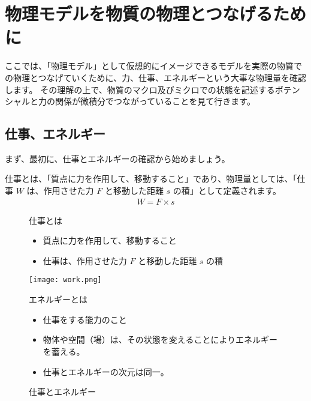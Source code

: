 \documentclass[uplatex,dvipdfmx,a4paper,11pt]{jsarticle}
\begin{document}
\section{物理モデルを物質の物理とつなげるために}

ここでは、「物理モデル」として仮想的にイメージできるモデルを実際の物質での物理とつなげていくために、力、仕事、エネルギーという大事な物理量を確認します。
その理解の上で、物質のマクロ及びミクロでの状態を記述するポテンシャルと力の関係が微積分でつながっていることを見て行きます。

\subsection{仕事、エネルギー}

まず、最初に、仕事とエネルギーの確認から始めましょう。

仕事とは、「質点に力を作用して、移動すること」であり、物理量としては、「仕事 $W$ は、作用させた力 $F$ と移動した距離 $s$ の積」として定義されます。
\begin{align*}
	W=F \times s
\end{align*}
\begin{figure}[htb]
	\begin{center}
		\begin{minipage}{0.42\textwidth}
			\large
			\begin{itembox}[l]{仕事とは}
				\begin{itemize}
					\item 質点に力を作用して、移動すること
					\item 仕事は、作用させた力 $F$ と移動した距離 $s$ の積
				\end{itemize}
					\texttt{[image: work.png]}
			\end{itembox}
		\end{minipage}
		\begin{minipage}{0.42\textwidth}
			\large
			\begin{itembox}[l]{エネルギーとは}
				\begin{itemize}
					\item 仕事をする能力のこと
					\item 物体や空間（場）は、その状態を変えることによりエネルギーを蓄える。
					\item 仕事とエネルギーの次元は同一。
				\end{itemize}
			\end{itembox}
		\end{minipage}
		\caption{仕事とエネルギー}
		\label{fig:work_energy}
	\end{center}
\end{figure}
\end{document}
